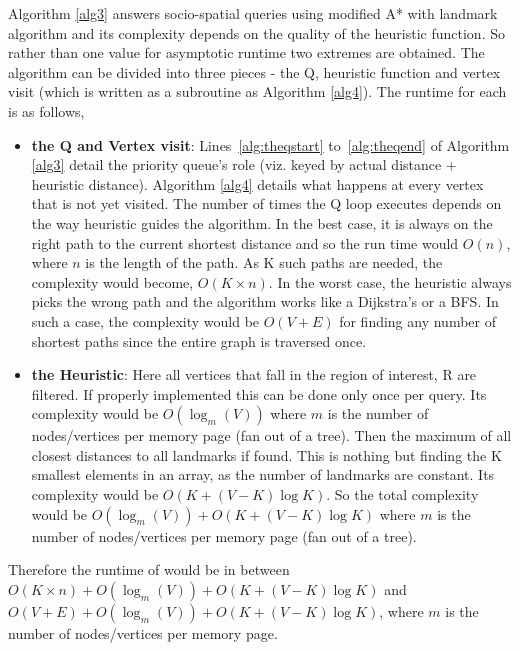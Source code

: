 Algorithm \ref{alg3} answers socio-spatial queries using modified A* with landmark algorithm and its complexity depends on the quality of the heuristic function. So rather than one value for asymptotic runtime two extremes are obtained. The algorithm can be divided into three pieces - the Q, heuristic function and vertex visit (which is written as a subroutine as Algorithm \ref{alg4}). The runtime for each is as follows,

\begin{itemize}

	\item \textbf{the Q and Vertex visit}: Lines~\ref{alg:theqstart} to~\ref{alg:theqend} of Algorithm \ref{alg3} detail the priority queue's role (viz. keyed by actual distance + heuristic distance). Algorithm \ref{alg4} details what happens at every vertex that is not yet visited. The number of times the Q loop executes depends on the way heuristic guides the algorithm. In the best case, it is always on the right path to the current shortest distance and so the run time would $O(n)$, where $n$ is the length of the path. As K such paths are needed, the complexity would become, $O(K \times n)$. In the worst case, the heuristic always picks the wrong path and the algorithm works like a Dijkstra's or a BFS. In such a case, the complexity would be $O(V + E)$ for finding any number of shortest paths since the entire graph is traversed once.

	\item \textbf{the Heuristic}: Here all vertices that fall in the region of interest, R are filtered. If properly implemented this can be done only once per query. Its complexity would be $O(\log_m (V))$ where $m$ is the number of nodes/vertices per memory page (fan out of a tree). Then the maximum of all closest distances to all landmarks if found. This is nothing but finding the K smallest elements in an array, as the number of landmarks are constant. Its complexity would be $O(K + (V-K)\log K)$. So the total complexity would be $O(\log_m (V)) + O(K + (V-K)\log K)$ where $m$ is the number of nodes/vertices per memory page (fan out of a tree).
\end{itemize}


Therefore the runtime of {\rrp} would be in between $O(K \times n) + O(\log_m (V)) + O(K + (V-K)\log K)$ and $O(V + E) + O(\log_m (V)) + O(K + (V-K)\log K)$, where $m$ is the number of nodes/vertices per memory page.
